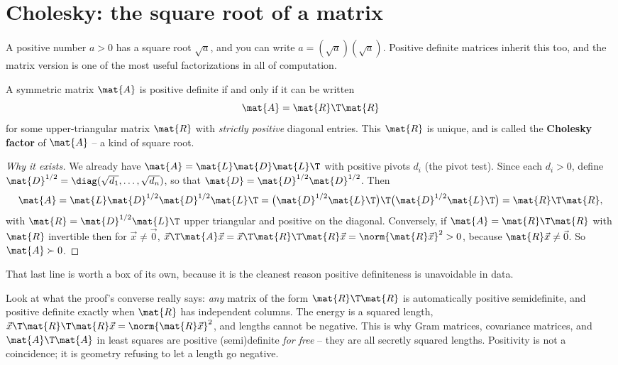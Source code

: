 \section{Cholesky: the square root of a matrix}

A positive number $a>0$ has a square root $\sqrt a$, and you can write $a = (\sqrt a)(\sqrt a)$.
Positive definite matrices inherit this too, and the matrix version is one of the most useful
factorizations in all of computation.

\begin{theorem}
\label{ch27:thm-cholesky}
A symmetric matrix $\mat{A}$ is positive definite if and only if it can be written
\[
  \mat{A} = \mat{R}\T\mat{R}
\]
for some upper-triangular matrix $\mat{R}$ with \emph{strictly positive} diagonal entries. This
$\mat{R}$ is unique, and is called the \textbf{Cholesky factor} of $\mat{A}$ -- a kind of square
root.
\end{theorem}

\begin{proof}[Why it exists]
We already have $\mat{A} = \mat{L}\mat{D}\mat{L}\T$ with positive pivots $d_i$ (the pivot test). Since
each $d_i > 0$, define $\mat{D}^{1/2} = \diag(\sqrt{d_1},\dots,\sqrt{d_n})$, so that $\mat{D} =
\mat{D}^{1/2}\mat{D}^{1/2}$. Then
\[
  \mat{A} = \mat{L}\mat{D}^{1/2}\mat{D}^{1/2}\mat{L}\T
  = \big(\mat{D}^{1/2}\mat{L}\T\big)\T\big(\mat{D}^{1/2}\mat{L}\T\big)
  = \mat{R}\T\mat{R},
\]
with $\mat{R} = \mat{D}^{1/2}\mat{L}\T$ upper triangular and positive on the diagonal. Conversely, if
$\mat{A}=\mat{R}\T\mat{R}$ with $\mat{R}$ invertible then for $\vec{x}\neq\vec{0}$,
$\vec{x}\T\mat{A}\vec{x} = \vec{x}\T\mat{R}\T\mat{R}\vec{x} = \norm{\mat{R}\vec{x}}^2 > 0$, because
$\mat{R}\vec{x}\neq\vec{0}$. So $\mat{A}\succ0$. \end{proof}

That last line is worth a box of its own, because it is the cleanest reason positive definiteness is
unavoidable in data.

\begin{aestheticbox}
Look at what the proof's converse really says: \emph{any} matrix of the form $\mat{R}\T\mat{R}$ is
automatically positive semidefinite, and positive definite exactly when $\mat{R}$ has independent
columns. The energy is a squared length, $\vec{x}\T\mat{R}\T\mat{R}\vec{x}=\norm{\mat{R}\vec{x}}^2$,
and lengths cannot be negative. This is why Gram matrices, covariance matrices, and
$\mat{A}\T\mat{A}$ in least squares are positive (semi)definite \emph{for free} -- they are all
secretly squared lengths. Positivity is not a coincidence; it is geometry refusing to let a length
go negative.
\end{aestheticbox}

